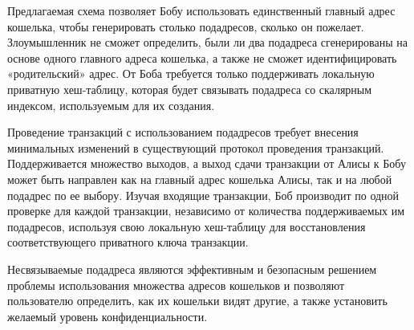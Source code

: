 \documentclass{mrl}
\begin{document}
Предлагаемая схема позволяет Бобу использовать единственный главный адрес кошелька, чтобы генерировать столько подадресов, сколько он пожелает. Злоумышленник не сможет определить, были ли два подадреса сгенерированы на основе одного главного адреса кошелька, а также не сможет идентифицировать «родительский» адрес. От Боба требуется только поддерживать локальную приватную хеш-таблицу, которая будет связывать подадреса со скалярным индексом, используемым для их создания.

Проведение транзакций с использованием подадресов требует внесения минимальных изменений в существующий протокол проведения транзакций. Поддерживается множество выходов, а выход сдачи транзакции от Алисы к Бобу может быть направлен как на главный адрес кошелька Алисы, так и на любой подадрес по ее выбору. Изучая входящие транзакции, Боб производит по одной проверке для каждой транзакции, независимо от количества поддерживаемых им подадресов, используя свою локальную хеш-таблицу для восстановления соответствующего приватного ключа транзакции.

Несвязываемые подадреса являются эффективным и безопасным решением проблемы использования множества адресов кошельков и позволяют пользователю определить, как их кошельки видят другие, а также установить желаемый уровень конфиденциальности.


\end{document}
